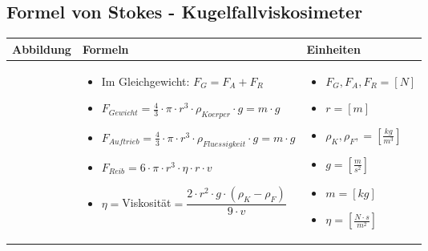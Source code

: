 \subsection{Formel von Stokes - Kugelfallviskosimeter}				%
	\begin{tabular}{ | m{4cm} | m{10cm} | m{4cm} | }
		\hline
		Abbildung & Formeln & Einheiten \\ \hline
		\hline
		\begin{minipage}{.3\textwidth}
			\tabImg[width=4.2cm]{images/Stokes}
		\end{minipage}
		&
		\begin{itemize}
			\item Im Gleichgewicht: $F_{G}=F_{A}+F_{R}$	
			\item $F_{Gewicht}=\frac{4}{3}\cdot \pi \cdot r^{3}\cdot  \rho_{Koerper} \cdot g=m\cdot g$	 
			\item $F_{Auftrieb}=\frac{4}{3}\cdot \pi \cdot r^{3}\cdot  \rho_{Fluessigkeit} \cdot g=m\cdot g$
			\item $F_{Reib}=6\cdot \pi \cdot r^{3}\cdot  \eta\cdot r\cdot v$	
			\item $\eta=$Viskosität$=\dfrac{2\cdot r^{2}\cdot g\cdot (\rho_{K}-\rho_{F})}{9\cdot v}$
		\end{itemize}
		& 
		\begin{itemize}
			\item $F_{G},F_{A},F_{R}=[N]$
			\item $r=[m]$	
			\item $\rho_{K},\rho_{F},=[\frac{kg}{m^3}]$	
			\item $g=[\frac{m}{s^{2}}]$
			\item $m=[kg]$
			\item $\eta=[\frac{N\cdot s}{m^{2}}]$
		\end{itemize}
		\\ \hline
	\end{tabular}

\clearpage

